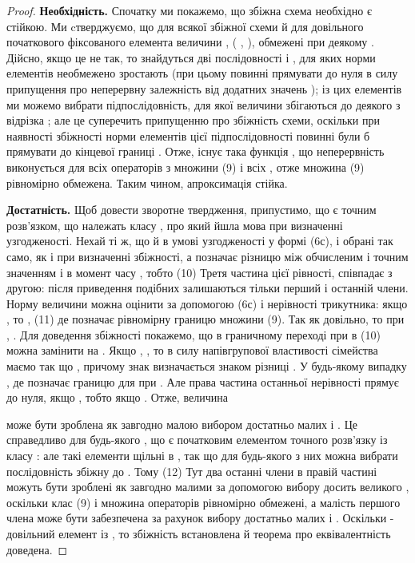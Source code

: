 \begin{proof}
    \textbf{Необхідність.} Спочатку ми покажемо, що збіжна схема необхідно є стійкою. Ми cтверджуємо, що для всякої збіжної схеми й для довільного початкового фіксованого елемента   величини
 , ( ,  ),
обмежені при деякому   . Дійсно, якщо це не так, то знайдуться дві послідовності    і   , для яких норми елементів  
необмежено зростають (при цьому   повинні прямувати до нуля в силу припущення про неперервну залежність   від додатних значень  ); із цих елементів ми можемо вибрати підпослідовність, для якої величини   збігаються до деякого    з відрізка  ;
але це суперечить припущенню про збіжність схеми, оскільки при наявності збіжності норми елементів цієї підпослідовності повинні були б прямувати до кінцевої границі  . Отже, існує така функція  , що неперервність   виконується для всіх операторів з множини (9) і всіх  , отже множина (9) рівномірно обмежена. Таким чином, апроксимація стійка. \medskip

\textbf{Достатність.} Щоб довести зворотне твердження, припустимо, що   є точним розв'язком, що належать класу  , про який йшла мова при визначенні узгодженості. Нехай   ті ж, що й в умові узгодженості у формі (6с),   і   обрані так само, як і при визначенні збіжності, а   позначає різницю між обчисленим і точним значенням і в момент часу  , тобто
            (10)
Третя частина цієї рівності, співпадає з другою: після приведення подібних залишаються тільки перший і останній члени. Норму величини   можна оцінити за допомогою (6с) і нерівності трикутника: якщо  , то
       ,    (11)
де   позначає рівномірну границю множини (9). Так як    довільно, то    при  ,  . Для доведення збіжності покажемо, що в граничному переході при   в (10) можна замінити   на  . Якщо  ,  , то в силу напівгрупової властивості сімейства   маємо   так що  , причому знак визначається знаком різниці  . У будь-якому випадку
      ,
де   позначає границю для    при  . Але права частина останньої нерівності прямує до нуля, якщо  , тобто якщо  . Отже, величина 
     
може бути зроблена як завгодно малою вибором достатньо малих   і  . Це справедливо для будь-якого  , що є початковим елементом точного розв'язку із класу  : але такі елементи щільні в  , так що для будь-якого   з них можна вибрати послідовність   збіжну до   . Тому
                                (12)
Тут два останні члени в правій частині можуть бути зроблені як завгодно малими за допомогою вибору досить великого  , оскільки клас (9) і множина операторів   рівномірно обмежені, а малість першого члена може бути забезпечена за рахунок вибору достатньо малих   і  . Оскільки    - довільний елемент із  , то збіжність встановлена й теорема про еквівалентність доведена.
\end{proof}

